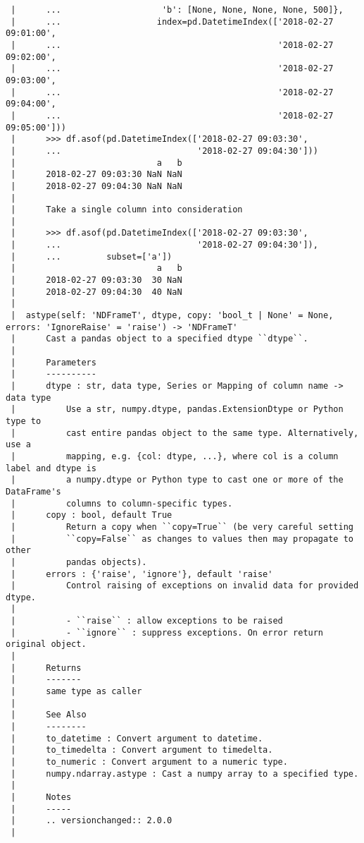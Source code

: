 \documentclass[
  letterpaper,
  DIV=11,
  numbers=noendperiod]{scrreprt}
\begin{document}
\begin{verbatim}
 |      ...                    'b': [None, None, None, None, 500]},
 |      ...                   index=pd.DatetimeIndex(['2018-02-27 09:01:00',
 |      ...                                           '2018-02-27 09:02:00',
 |      ...                                           '2018-02-27 09:03:00',
 |      ...                                           '2018-02-27 09:04:00',
 |      ...                                           '2018-02-27 09:05:00']))
 |      >>> df.asof(pd.DatetimeIndex(['2018-02-27 09:03:30',
 |      ...                           '2018-02-27 09:04:30']))
 |                            a   b
 |      2018-02-27 09:03:30 NaN NaN
 |      2018-02-27 09:04:30 NaN NaN
 |      
 |      Take a single column into consideration
 |      
 |      >>> df.asof(pd.DatetimeIndex(['2018-02-27 09:03:30',
 |      ...                           '2018-02-27 09:04:30']),
 |      ...         subset=['a'])
 |                            a   b
 |      2018-02-27 09:03:30  30 NaN
 |      2018-02-27 09:04:30  40 NaN
 |  
 |  astype(self: 'NDFrameT', dtype, copy: 'bool_t | None' = None, errors: 'IgnoreRaise' = 'raise') -> 'NDFrameT'
 |      Cast a pandas object to a specified dtype ``dtype``.
 |      
 |      Parameters
 |      ----------
 |      dtype : str, data type, Series or Mapping of column name -> data type
 |          Use a str, numpy.dtype, pandas.ExtensionDtype or Python type to
 |          cast entire pandas object to the same type. Alternatively, use a
 |          mapping, e.g. {col: dtype, ...}, where col is a column label and dtype is
 |          a numpy.dtype or Python type to cast one or more of the DataFrame's
 |          columns to column-specific types.
 |      copy : bool, default True
 |          Return a copy when ``copy=True`` (be very careful setting
 |          ``copy=False`` as changes to values then may propagate to other
 |          pandas objects).
 |      errors : {'raise', 'ignore'}, default 'raise'
 |          Control raising of exceptions on invalid data for provided dtype.
 |      
 |          - ``raise`` : allow exceptions to be raised
 |          - ``ignore`` : suppress exceptions. On error return original object.
 |      
 |      Returns
 |      -------
 |      same type as caller
 |      
 |      See Also
 |      --------
 |      to_datetime : Convert argument to datetime.
 |      to_timedelta : Convert argument to timedelta.
 |      to_numeric : Convert argument to a numeric type.
 |      numpy.ndarray.astype : Cast a numpy array to a specified type.
 |      
 |      Notes
 |      -----
 |      .. versionchanged:: 2.0.0
 |      

\end{verbatim}
\end{document}
